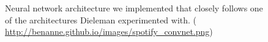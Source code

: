 \documentclass[11pt, a4paper]{article}
\begin{document}
    \begin{figure}
      \centering
      \caption{Neural network architecture we implemented that closely follows
        one of the architectures Dieleman experimented with.
        (\url{ http://benanne.github.io/images/spotify\_convnet.png})}
    \end{figure}
\end{document}
